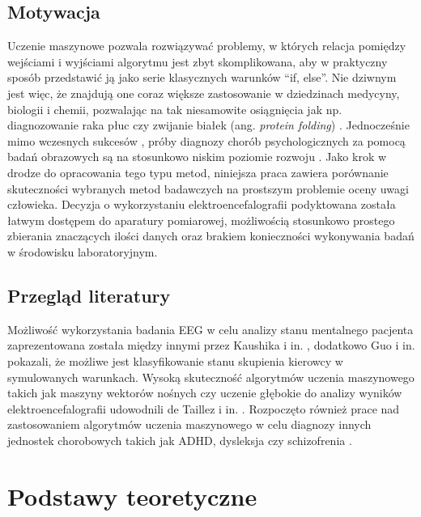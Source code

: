 \documentclass{./assets/wfis}
\begin{document}
\section{Motywacja}
Uczenie maszynowe pozwala rozwiązywać problemy, w których relacja pomiędzy wejściami i wyjściami algorytmu jest zbyt skomplikowana, aby w praktyczny sposób przedstawić ją jako serie klasycznych warunków “if, else”. Nie dziwnym jest więc, że znajdują one coraz większe zastosowanie w dziedzinach medycyny, biologii i chemii, pozwalając na tak niesamowite osiągnięcia jak np. diagnozowanie raka płuc \cite{li_machine_2022} czy zwijanie białek (ang. \textit{protein folding}) \cite{jumper_highly_2021}. Jednocześnie mimo wczesnych sukcesów \cite{some comparasion}, próby diagnozy chorób psychologicznych za pomocą badań obrazowych są na stosunkowo niskim poziomie rozwoju \cite{badania adhd i podobne}. Jako krok w drodze do opracowania tego typu metod, niniejsza praca zawiera porównanie skuteczności wybranych metod badawczych na prostszym problemie oceny uwagi człowieka. Decyzja o wykorzystaniu elektroencefalografii podyktowana została łatwym dostępem do aparatury pomiarowej, możliwością stosunkowo prostego zbierania znaczących ilości danych oraz brakiem konieczności wykonywania badań w środowisku laboratoryjnym.

\section{Przegląd literatury}
Możliwość wykorzystania badania EEG w celu analizy stanu mentalnego pacjenta zaprezentowana została między innymi przez Kaushika i in. \cite{kaushik_decoding_2022}, dodatkowo Guo i in. \cite{guo_detection_2018} pokazali, że możliwe jest klasyfikowanie stanu skupienia kierowcy w symulowanych warunkach. Wysoką skuteczność algorytmów uczenia maszynowego takich jak maszyny wektorów nośnych czy uczenie głębokie do analizy wyników elektroencefalografii udowodnili de Taillez i in. \cite{de_taillez_machine_2020}. Rozpoczęto również prace nad zastosowaniem algorytmów uczenia maszynowego w celu diagnozy innych jednostek chorobowych takich jak ADHD, dysleksja czy schizofrenia \cite{ahire_comprehensive_2022, joshi_review_2021, clarke_eeg_2002}.

\chapter{Podstawy teoretyczne}
\end{document}
